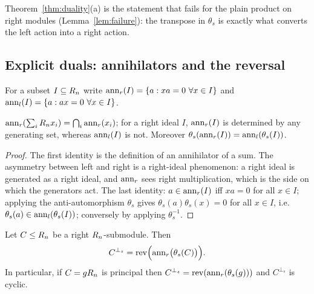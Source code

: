 \begin{remark}
Theorem~\ref{thm:duality}(a) is the statement that fails for the plain product
on right modules (Lemma~\ref{lem:failure}): the transpose in $\theta_s$ is
exactly what converts the left action into a right action.
\end{remark}

\subsection{Explicit duals: annihilators and the reversal}

For a subset $I\subseteq R_n$ write
$\operatorname{ann}_r(I)=\{a:xa=0\ \forall x\in I\}$ and
$\operatorname{ann}_l(I)=\{a:ax=0\ \forall x\in I\}$.

\begin{lemma}\label{lem:ann}
$\operatorname{ann}_r(\sum_iR_n x_i)=\bigcap_i\operatorname{ann}_r(x_i)$; for a right ideal
$I$, $\operatorname{ann}_r(I)$ is determined by any generating set, whereas $\operatorname{ann}_l(I)$ is
not. Moreover $\theta_s(\operatorname{ann}_r(I))=\operatorname{ann}_l(\theta_s(I))$.
\end{lemma}

\begin{proof}
The first identity is the definition of an annihilator of a sum. The asymmetry
between left and right is a right-ideal phenomenon: a right ideal is generated
as a right ideal, and $\operatorname{ann}_r$ sees right multiplication, which is the side on
which the generators act. The last identity: $a\in\operatorname{ann}_r(I)$ iff $xa=0$ for all
$x\in I$; applying the anti-automorphism $\theta_s$ gives
$\theta_s(a)\theta_s(x)=0$ for all $x\in I$, i.e.
$\theta_s(a)\in\operatorname{ann}_l(\theta_s(I))$; conversely by applying $\theta_s^{-1}$.
\end{proof}

\begin{theorem}\label{thm:dualformula}
Let $C\le R_n$ be a right $R_n$-submodule. Then
\[
  C^{\perp_s}=\operatorname{rev}\Bigl(\operatorname{ann}_r\bigl(\theta_s(C)\bigr)\Bigr).
\]
In particular, if $C=gR_n$ is principal then
$C^{\perp_s}=\operatorname{rev}(\operatorname{ann}_r(\theta_s(g)))$ and $C^{\perp_s}$ is cyclic.
\end{theorem}

